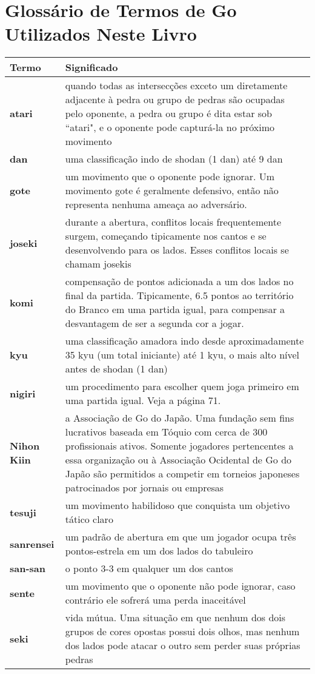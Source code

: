 \chapter{Glossário de Termos de Go Utilizados Neste Livro}

\begin{longtable}{l|p{100mm}} 
 \hline
 \textbf{Termo} & \textbf{Significado} \\
 \hline \hline
 \textbf{atari} & quando todas as intersecções exceto um diretamente adjacente à pedra ou grupo de pedras são ocupadas pelo oponente, a pedra ou grupo é dita estar sob ``atari", e o oponente pode capturá-la no próximo movimento \\ 
 \hline
 \textbf{dan} & uma classificação indo de shodan (1 dan) até 9 dan \\
 \hline
 \textbf{gote} & um movimento que o oponente pode ignorar. Um movimento gote é geralmente defensivo, então não representa nenhuma ameaça ao adversário. \\
 \hline
 \textbf{joseki} & durante a abertura, conflitos locais frequentemente surgem, começando tipicamente nos cantos e se desenvolvendo para os lados. Esses conflitos locais se chamam josekis \\
 \hline
 \textbf{komi} & compensação de pontos adicionada a um dos lados no final da partida. Tipicamente, 6.5 pontos ao território do Branco em uma partida igual, para compensar a desvantagem de ser a segunda cor a jogar. \\
 \hline
 \textbf{kyu} & uma classificação amadora indo desde aproximadamente 35 kyu (um total iniciante) até 1 kyu, o mais alto nível antes de shodan (1 dan) \\
 \hline
 \textbf{nigiri} & um procedimento para escolher quem joga primeiro em uma partida igual. Veja a página 71. \\
 \hline
 \textbf{Nihon Kiin} & a Associação de Go do Japão. Uma fundação sem fins lucrativos baseada em Tóquio com cerca de 300 profissionais ativos. Somente jogadores pertencentes a essa organização ou à Associação Ocidental de Go do Japão são permitidos a competir em torneios japoneses patrocinados por jornais ou empresas \\
 \hline
 \textbf{tesuji} & um movimento habilidoso que conquista um objetivo tático claro \\
 \hline
 \textbf{sanrensei} & um padrão de abertura em que um jogador ocupa três pontos-estrela em um dos lados do tabuleiro \\
 \hline
 \textbf{san-san} & o ponto 3-3 em qualquer um dos cantos \\
 \hline
 \textbf{sente} & um movimento que o oponente não pode ignorar, caso contrário ele sofrerá uma perda inaceitável \\
 \hline
 \textbf{seki} & vida mútua. Uma situação em que nenhum dos dois grupos de cores opostas possui dois olhos, mas nenhum dos lados pode atacar o outro sem perder suas próprias pedras \\
 \hline
\end{longtable}